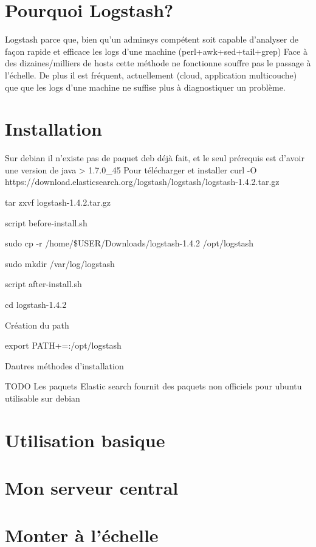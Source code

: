 \section{Pourquoi Logstash?}
Logstash parce que, bien qu'un adminsys compétent soit capable d'analyser
de façon rapide et efficace les logs d'une machine (perl+awk+sed+tail+grep)
Face à des dizaines/milliers de hosts cette méthode ne fonctionne souffre pas
le passage à l'échelle.
De plus il est fréquent, actuellement (cloud, application multicouche) que
que les logs d'une machine ne suffise plus à diagnostiquer un problème.

\section{Installation}
Sur debian il n'existe pas de paquet deb déjà fait, et le seul prérequis 
est d'avoir une version de java > 1.7.0\_45
Pour télécharger et installer
curl -O https://download.elasticsearch.org/logstash/logstash/logstash-1.4.2.tar.gz

tar zxvf logstash-1.4.2.tar.gz

script before-install.sh

sudo cp -r /home/\$USER/Downloads/logstash-1.4.2 /opt/logstash

sudo mkdir /var/log/logstash

script after-install.sh

cd logstash-1.4.2


Création du path

export PATH+=:/opt/logstash



Dautres méthodes d'installation

TODO
Les paquets
Elastic search fournit des paquets non officiels pour ubuntu utilisable sur
debian



\section{Utilisation basique}




\section{Mon serveur central}



\section{Monter à l'échelle}

